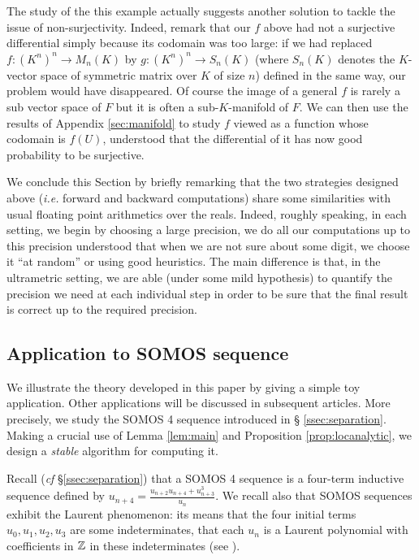 \documentclass{lms}
\begin{document}
The study of the this example actually suggests another solution to 
tackle the issue of non-surjectivity. Indeed, remark that our $f$ above 
had not a surjective differential simply because its codomain was too 
large: if we had replaced $f : (K^n)^n \to M_n(K)$ by $g : (K^n)^n \to 
S_n(K)$ (where $S_n(K)$ denotes the $K$-vector space of symmetric matrix 
over $K$ of size $n$) defined in the same way, our problem would have 
disappeared. Of course the image of a general $f$ is rarely a sub vector 
space of $F$ but it is often a sub-$K$-manifold of $F$. We can then use 
the results of Appendix \ref{sec:manifold} to study $f$ viewed as a 
function whose codomain is $f(U)$, understood that the differential of 
it has now good probability to be surjective.

\medskip

We conclude this Section by briefly remarking that the two strategies designed 
above (\emph{i.e.} forward and backward computations) share some 
similarities with usual floating point arithmetics over the reals. 
Indeed, roughly speaking, in each setting, we begin by choosing a large 
precision, we do all our computations up to this precision understood 
that when we are not sure about some digit, we choose it ``at random'' 
or using good heuristics. The main difference is that, in the 
ultrametric setting, we are able (under some mild hypothesis) to 
quantify the precision we need at each individual step in order to be 
sure that the final result is correct up to the required precision.

\subsection{Application to SOMOS sequence}
\label{ssec:SOMOS-solution}

We illustrate the theory developed in this paper by giving a simple 
toy application. Other applications will be discussed in subsequent 
articles. More precisely, we study the SOMOS 4 sequence introduced in \S 
\ref{ssec:separation}. Making a crucial use of Lemma \ref{lem:main} and 
Proposition \ref{prop:locanalytic}, we design a \emph{stable} algorithm 
for computing it.

Recall (\emph{cf} \S \ref{ssec:separation}) that a SOMOS 4 sequence is a 
four-term inductive sequence defined by $u_{n+4} = \frac{u_{n+2} u_{n+4} 
+ u_{n+3}^3}{u_n}$. We recall also that SOMOS sequences exhibit the 
Laurent phenomenon: its means that the four initial terms $u_0, u_1, 
u_2, u_3$ are some indeterminates, that each $u_n$ is a Laurent 
polynomial with coefficients in $\mathbb Z$ in these indeterminates
(see \cite{fomin-zelevinsky:02a}).
\end{document}
